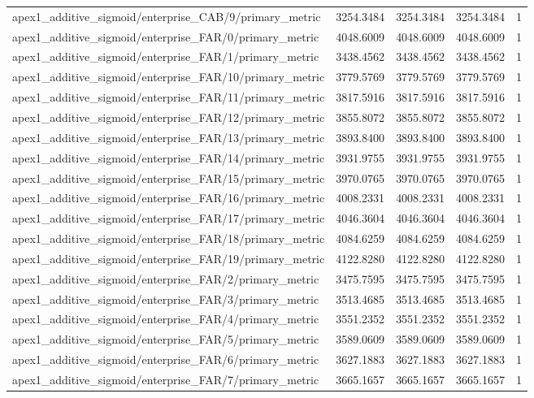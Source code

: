 \begin{table}[h]
\begin{tabular}{lrrrr}
apex1_additive_sigmoid/enterprise_CAB/9/primary_metric & 3254.3484 & 3254.3484 & 3254.3484 & 1 \\
apex1_additive_sigmoid/enterprise_FAR/0/primary_metric & 4048.6009 & 4048.6009 & 4048.6009 & 1 \\
apex1_additive_sigmoid/enterprise_FAR/1/primary_metric & 3438.4562 & 3438.4562 & 3438.4562 & 1 \\
apex1_additive_sigmoid/enterprise_FAR/10/primary_metric & 3779.5769 & 3779.5769 & 3779.5769 & 1 \\
apex1_additive_sigmoid/enterprise_FAR/11/primary_metric & 3817.5916 & 3817.5916 & 3817.5916 & 1 \\
apex1_additive_sigmoid/enterprise_FAR/12/primary_metric & 3855.8072 & 3855.8072 & 3855.8072 & 1 \\
apex1_additive_sigmoid/enterprise_FAR/13/primary_metric & 3893.8400 & 3893.8400 & 3893.8400 & 1 \\
apex1_additive_sigmoid/enterprise_FAR/14/primary_metric & 3931.9755 & 3931.9755 & 3931.9755 & 1 \\
apex1_additive_sigmoid/enterprise_FAR/15/primary_metric & 3970.0765 & 3970.0765 & 3970.0765 & 1 \\
apex1_additive_sigmoid/enterprise_FAR/16/primary_metric & 4008.2331 & 4008.2331 & 4008.2331 & 1 \\
apex1_additive_sigmoid/enterprise_FAR/17/primary_metric & 4046.3604 & 4046.3604 & 4046.3604 & 1 \\
apex1_additive_sigmoid/enterprise_FAR/18/primary_metric & 4084.6259 & 4084.6259 & 4084.6259 & 1 \\
apex1_additive_sigmoid/enterprise_FAR/19/primary_metric & 4122.8280 & 4122.8280 & 4122.8280 & 1 \\
apex1_additive_sigmoid/enterprise_FAR/2/primary_metric & 3475.7595 & 3475.7595 & 3475.7595 & 1 \\
apex1_additive_sigmoid/enterprise_FAR/3/primary_metric & 3513.4685 & 3513.4685 & 3513.4685 & 1 \\
apex1_additive_sigmoid/enterprise_FAR/4/primary_metric & 3551.2352 & 3551.2352 & 3551.2352 & 1 \\
apex1_additive_sigmoid/enterprise_FAR/5/primary_metric & 3589.0609 & 3589.0609 & 3589.0609 & 1 \\
apex1_additive_sigmoid/enterprise_FAR/6/primary_metric & 3627.1883 & 3627.1883 & 3627.1883 & 1 \\
apex1_additive_sigmoid/enterprise_FAR/7/primary_metric & 3665.1657 & 3665.1657 & 3665.1657 & 1 \\

\end{tabular}
\end{table}
